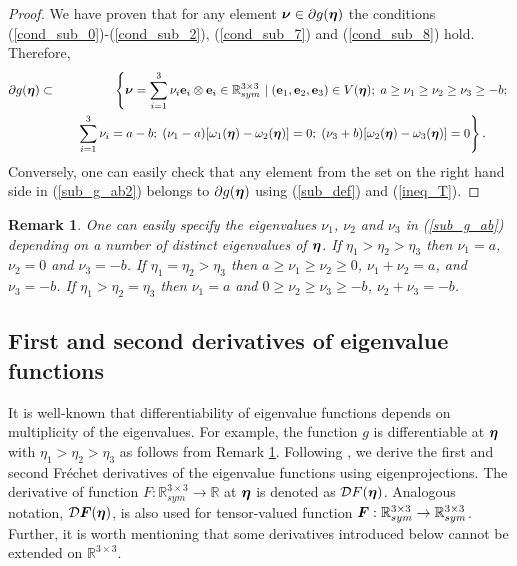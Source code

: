 \documentclass[a4paper,12pt]{article}
\newtheorem{remark}{Remark}[section]
\theoremstyle{remark}
\newcommand{\mbf}[1]{\mbox{\boldmath$#1$}}
\numberwithin{equation}{section}
\begin{document}
\begin{proof}
We have proven that for any element $\mbf\nu\in\partial g(\mbf\eta)$ the conditions (\ref{cond_sub_0})-(\ref{cond_sub_2}), (\ref{cond_sub_7}) and (\ref{cond_sub_8}) hold. Therefore,
\begin{eqnarray}
\partial g(\mbf\eta)&\subset&\left\{ \mbf\nu=\sum_{i=1}^3\nu_i\mathbf e_i\otimes\mathbf e_i\in\mathbb R^{3\times 3}_{sym}\ |\; (\mathbf e_1, \mathbf e_2, \mathbf e_3)\in V(\mbf\eta); \; a\geq\nu_1\geq\nu_2\geq\nu_3\geq -b;\right.\nonumber\\
&&\quad \left.\sum_{i=1}^3\nu_i=a-b;\; (\nu_1-a)[\omega_1(\mbf\eta)-\omega_2(\mbf\eta)]=0;\; (\nu_3+b)[\omega_2(\mbf\eta)-\omega_3(\mbf\eta)]=0 \right\}.\qquad
\label{sub_g_ab2}
\end{eqnarray}
Conversely, one can easily check that any element from the set on the right hand side in (\ref{sub_g_ab2}) belongs to $\partial g(\mbf\eta)$ using (\ref{sub_def}) and (\ref{ineq_T}).
\end{proof}

\begin{remark}
\emph{One can easily specify the eigenvalues $\nu_1$, $\nu_2$ and $\nu_3$ in (\ref{sub_g_ab}) depending on a number of distinct eigenvalues of  $\mbf\eta$. If $\eta_1>\eta_2>\eta_3$ then $\nu_1=a$, $\nu_2=0$ and $\nu_3=-b$. If $\eta_1=\eta_2>\eta_3$ then $a\geq\nu_1\geq\nu_2\geq0$, $\nu_1+\nu_2=a$, and $\nu_3=-b$. If $\eta_1>\eta_2=\eta_3$ then $\nu_1=a$ and $0\geq\nu_2\geq\nu_3\geq-b$, $\nu_2+\nu_3=-b$. }
\label{remark_subdif2}
\end{remark}


\subsection{First and second derivatives of eigenvalue functions}
\label{subsec_eigenprojection}

It is well-known that differentiability of eigenvalue functions depends on multiplicity of the eigenvalues. For example, the function $g$ is differentiable at $\mbf\eta$ with $\eta_1>\eta_2>\eta_3$ as follows from  Remark \ref{remark_subdif2}. Following \cite{NPO08, CaHo86}, we derive the first and second Fr\'echet derivatives of the eigenvalue functions using eigenprojections.  The derivative of function $F:\mathbb R^{3\times 3}_{sym}\rightarrow\mathbb R$ at $\mbf\eta$ is denoted as $\mathcal D F(\mbf\eta)$. Analogous notation, $\mathcal D \mbf F(\mbf\eta)$, is also used for tensor-valued function  $\mbf F:\mathbb R^{3\times 3}_{sym}\rightarrow\mathbb R^{3\times 3}_{sym}$. Further, it is worth mentioning that some derivatives introduced below cannot be extended on $\mathbb R^{3\times 3}$.
\end{document}
